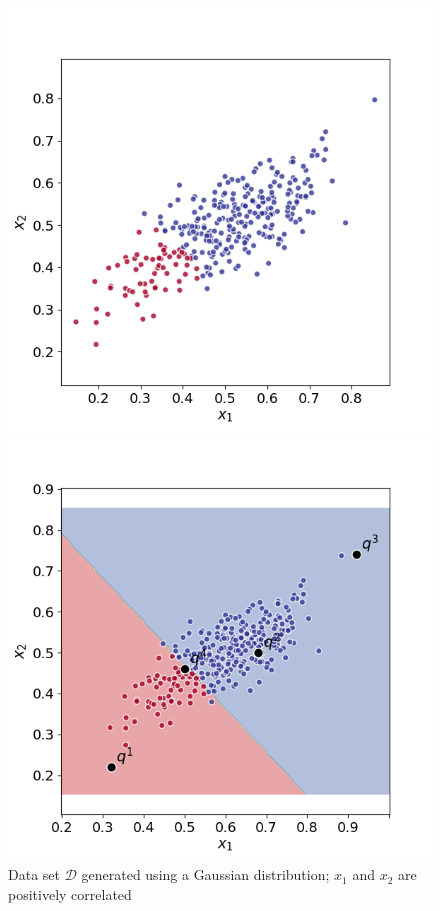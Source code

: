 \documentclass[11pt]{article}
\newcommand{\dee}{\mathcal{D}}
\begin{document}
\begin{figure}[!b] 
    \begin{minipage}[t]{0.32\linewidth}
        	\centering
        	\includegraphics[width=\textwidth]{submissions/submission1/shahbazi/example_1.png} 
        	\vspace{-9mm}\caption{\small Data set $\dee$ generated using a Gaussian distribution; $x_1$ and $x_2$ are positively correlated}
            \label{fig:ex1:1}
    \end{minipage}
    \hfill
    \begin{minipage}[t]{0.32\linewidth}
        \centering
        	\includegraphics[width =\textwidth]{submissions/submission1/shahbazi/example_2.png} 

\end{minipage}
\end{figure}
\end{document}
